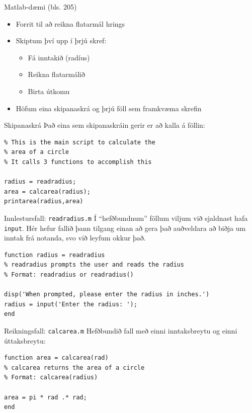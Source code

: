 \documentclass{beamer}
\begin{document}
\begin{frame}{Matlab-dæmi (bls. 205)}
\begin{itemize}
 \item Forrit til að reikna flatarmál hrings
 \item Skiptum því upp í þrjú skref:
 \begin{itemize}
  \item Fá inntakið (radíus)
  \item Reikna flatarmálið
  \item Birta útkomu
 \end{itemize}
 \item Höfum eina skipanaskrá og þrjú föll sem framkvæma skrefin
\end{itemize}
\end{frame}

\begin{frame}[fragile]{Skipanaskrá}
Það eina sem skipanaskráin gerir er að kalla á föllin:

\begin{verbatim}
% This is the main script to calculate the
% area of a circle
% It calls 3 functions to accomplish this

radius = readradius;
area = calcarea(radius);
printarea(radius,area)
\end{verbatim}
\end{frame}

\begin{frame}[fragile]{Innlestursfall: \texttt{readradius.m}}
\vspace{\baselineskip}
Í ``hefðbundnum'' föllum viljum við sjaldnast hafa \texttt{input}. Hér hefur fallið þann tilgang einan að gera það auðveldara að biðja um inntak frá notanda, svo við leyfum okkur það.

\begin{verbatim}
function radius = readradius
% readradius prompts the user and reads the radius
% Format: readradius or readradius()

disp('When prompted, please enter the radius in inches.')
radius = input('Enter the radius: ');
end
\end{verbatim}
\end{frame}

\begin{frame}[fragile]{Reikningsfall: \texttt{calcarea.m}}
\vspace{\baselineskip}
Hefðbundið fall með einni inntaksbreytu og einni úttaksbreytu:

\begin{verbatim}
function area = calcarea(rad)
% calcarea returns the area of a circle
% Format: calcarea(radius)

area = pi * rad .* rad;
end
\end{verbatim}
\end{frame}
\end{document}
